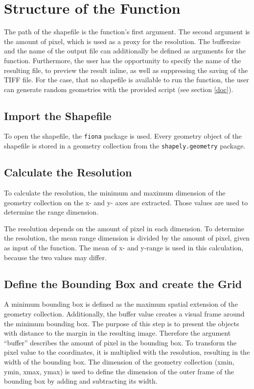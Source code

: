 \documentclass[10pt, a4paper]{article}
\begin{document}
	\section{Structure of the Function}
	The path of the shapefile is the function's first argument. 
	The second argument is the amount of pixel, which is used as a proxy for the resolution. The buffersize and the name of the output file can additionally be defined as arguments for the function. Furthermore, the user has the opportunity to specify the name of the resulting file, to preview the result inline, as well as suppressing the saving of the TIFF file.
	For the case, that no shapefile is available to run the function, the user can generate random geometries with the provided script (see section  \ref{doc}).
	
	\subsection*{Import the Shapefile}
	To open the shapefile, the \texttt{fiona} package is used. Every geometry object of the shapefile is stored in a geometry collection from the \texttt{shapely.geometry} package.
	
	\subsection*{Calculate the Resolution}
	To calculate the resolution, the minimum and maximum dimension of the geometry collection on the x- and y- axes are extracted.  Those values are used to determine the range dimension. 
	
	The resolution depends on the amount of pixel in each dimension. To determine the resolution, the mean range dimension is divided by the amount of pixel, given as input of the function. The mean of x- and y-range is used in this calculation, because the two values may differ. 
	
	\subsection*{Define the Bounding Box and create the Grid}
	 A minimum bounding box is defined as the maximum spatial extension of the geometry collection. Additionally, the buffer value creates a visual frame around the minimum bounding box. The purpose of this step is to present the objects with distance to the margin in the resulting image. Therefore the argument ``buffer'' describes the amount of pixel in the bounding box.  To transform the pixel value to the coordinates, it is multiplied with the resolution, resulting in the width of the bounding box. The dimension of the geometry collection (xmin, ymin, xmax, ymax) is used to define the dimension of the outer frame of the bounding box by adding and subtracting its width.
	
\end{document}
